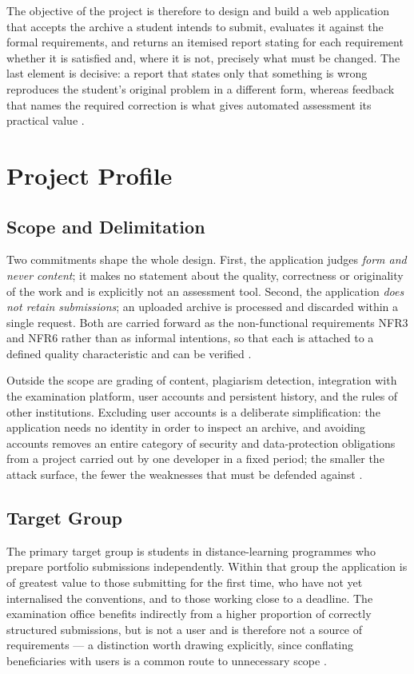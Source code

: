 \documentclass[a4paper,11pt]{article}
\begin{document}
The objective of the project is therefore to design and build a web application
that accepts the archive a student intends to submit, evaluates it against the
formal requirements, and returns an itemised report stating for each requirement
whether it is satisfied and, where it is not, precisely what must be changed.
The last element is decisive: a report that states only that something is wrong
reproduces the student's original problem in a different form, whereas feedback
that names the required correction is what gives automated assessment its
practical value \citep{Combefis2022}.

\section{Project Profile}\label{sec:profile}

\subsection{Scope and Delimitation}\label{subsec:scope}

Two commitments shape the whole design. First, the application judges
\textit{form and never content}; it makes no statement about the quality,
correctness or originality of the work and is explicitly not an assessment tool.
Second, the application \textit{does not retain submissions}; an uploaded
archive is processed and discarded within a single request. Both are carried
forward as the non-functional requirements NFR3 and NFR6 rather than as informal
intentions, so that each is attached to a defined quality characteristic and can
be verified \citep{ISO25010}.

Outside the scope are grading of content, plagiarism detection, integration with
the examination platform, user accounts and persistent history, and the rules of
other institutions. Excluding user accounts is a deliberate simplification: the
application needs no identity in order to inspect an archive, and avoiding
accounts removes an entire category of security and data-protection obligations
from a project carried out by one developer in a fixed period; the smaller the
attack surface, the fewer the weaknesses that must be defended against
\citep{OWASP2021}.

\subsection{Target Group}\label{subsec:target}

The primary target group is students in distance-learning programmes who prepare
portfolio submissions independently. Within that group the application is of
greatest value to those submitting for the first time, who have not yet
internalised the conventions, and to those working close to a deadline. The
examination office benefits indirectly from a higher proportion of correctly
structured submissions, but is not a user and is therefore not a source of
requirements --- a distinction worth drawing explicitly, since conflating
beneficiaries with users is a common route to unnecessary scope
\citep{Sommerville2020}.
\end{document}
